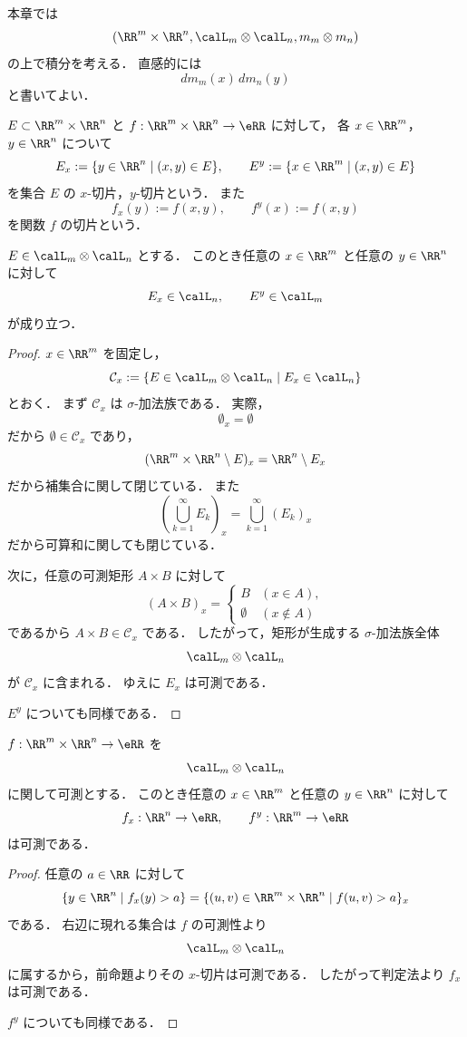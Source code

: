 \begin{remark}
本章では
\[
(\RR^m\times\RR^n,\calL_m\otimes\calL_n,m_m\otimes m_n)
\]
の上で積分を考える．
直感的には
\[
dm_m(x)\,dm_n(y)
\]
と書いてよい．
\end{remark}

\begin{definition}[切片]
$E\subset \RR^m\times\RR^n$ と
$f:\RR^m\times\RR^n\to\eRR$ に対して，
各 $x\in\RR^m$，$y\in\RR^n$ について
\[
E_x:=\{y\in\RR^n\mid (x,y)\in E\},
\qquad
E^y:=\{x\in\RR^m\mid (x,y)\in E\}
\]
を集合 $E$ の $x$-切片，$y$-切片という．
また
\[
f_x(y):=f(x,y),
\qquad
f^y(x):=f(x,y)
\]
を関数 $f$ の切片という．
\end{definition}

\begin{proposition}[切片の可測性]
$E\in \calL_m\otimes\calL_n$ とする．
このとき任意の $x\in\RR^m$ と任意の $y\in\RR^n$ に対して
\[
E_x\in \calL_n,
\qquad
E^y\in \calL_m
\]
が成り立つ．
\end{proposition}
\begin{proof}
$x\in\RR^m$ を固定し，
\[
\mathcal C_x:=\{E\in \calL_m\otimes\calL_n \mid E_x\in\calL_n\}
\]
とおく．
まず $\mathcal C_x$ は $\sigma$-加法族である．
実際，
\[
\emptyset_x=\emptyset
\]
だから $\emptyset\in\mathcal C_x$ であり，
\[
(\RR^m\times\RR^n\setminus E)_x=\RR^n\setminus E_x
\]
だから補集合に関して閉じている．
また
\[
\left(\bigcup_{k=1}^{\infty}E_k\right)_x=\bigcup_{k=1}^{\infty}(E_k)_x
\]
だから可算和に関しても閉じている．

次に，任意の可測矩形 $A\times B$ に対して
\[
(A\times B)_x
=
\begin{cases}
B & (x\in A),\\
\emptyset & (x\notin A)
\end{cases}
\]
であるから $A\times B\in\mathcal C_x$ である．
したがって，矩形が生成する $\sigma$-加法族全体
\[
\calL_m\otimes\calL_n
\]
が $\mathcal C_x$ に含まれる．
ゆえに $E_x$ は可測である．

$E^y$ についても同様である．
\end{proof}

\begin{corollary}[切片関数の可測性]
$f:\RR^m\times\RR^n\to\eRR$ を
\[
\calL_m\otimes\calL_n
\]
に関して可測とする．
このとき任意の $x\in\RR^m$ と任意の $y\in\RR^n$ に対して
\[
f_x:\RR^n\to\eRR,
\qquad
f^y:\RR^m\to\eRR
\]
は可測である．
\end{corollary}
\begin{proof}
任意の $a\in\RR$ に対して
\[
\{y\in\RR^n\mid f_x(y)>a\}
=
\{(u,v)\in\RR^m\times\RR^n\mid f(u,v)>a\}_x
\]
である．
右辺に現れる集合は $f$ の可測性より
\[
\calL_m\otimes\calL_n
\]
に属するから，前命題よりその $x$-切片は可測である．
したがって判定法より $f_x$ は可測である．

$f^y$ についても同様である．
\end{proof}

